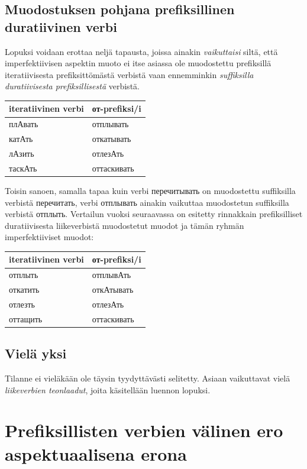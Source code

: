 \documentclass[]{scrreprt}
\begin{document}
\subsection{Muodostuksen pohjana prefiksillinen duratiivinen
verbi}\label{muodostuksen-pohjana-prefiksillinen-duratiivinen-verbi}

Lopuksi voidaan erottaa neljä tapausta, joissa ainakin
\emph{vaikuttaisi} siltä, että imperfektiivisen aspektin muoto ei itse
asiassa ole muodostettu prefiksillä iteratiivisesta prefiksittömästä
verbistä vaan ennemminkin \emph{suffiksilla duratiivisesta
prefiksillisestä} verbistä.

\begin{longtable}[c]{@{}ll@{}}
\toprule
iteratiivinen verbi & от-prefiksi/i\tabularnewline
\midrule
\endhead
плАвать & отплывать\tabularnewline
катАть & откатывать\tabularnewline
лАзить & отлезАть\tabularnewline
таскАть & оттаскивать\tabularnewline
\bottomrule
\end{longtable}

Toisin sanoen, samalla tapaa kuin verbi перечитывать on muodostettu
suffiksilla verbistä перечитать, verbi отплывать ainakin vaikuttaa
muodostetun suffiksilla verbistä отплыть. Vertailun vuoksi seuraavassa
on esitetty rinnakkain prefiksilliset duratiivisesta liikeverbistä
muodostetut muodot ja tämän ryhmän imperfektiiviset muodot:

\begin{longtable}[c]{@{}ll@{}}
\toprule
iteratiivinen verbi & от-prefiksi/i\tabularnewline
\midrule
\endhead
отплыть & отплывАть\tabularnewline
откатить & откАтывать\tabularnewline
отлезть & отлезАть\tabularnewline
оттащить & оттаскивать\tabularnewline
\bottomrule
\end{longtable}

\subsection{Vielä yksi}\label{vieluxe4-yksi}

Tilanne ei vieläkään ole täysin tyydyttävästi selitetty. Asiaan
vaikuttavat vielä \emph{liikeverbien teonlaadut}, joita käsitellään
luennon lopuksi.

\section{Prefiksillisten verbien välinen ero aspektuaalisena
erona}\label{prefiksillisten-verbien-vuxe4linen-ero-aspektuaalisena-erona}
\end{document}
